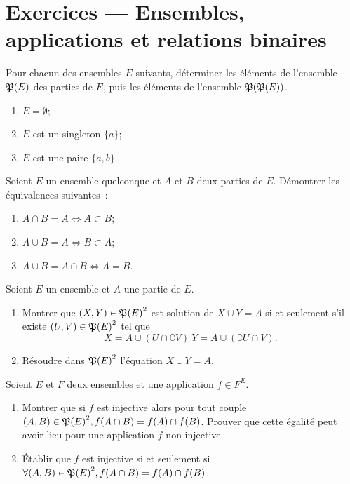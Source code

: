 \section{Exercices --- Ensembles, applications et relations binaires}

\begin{exercice}
  Pour chacun des ensembles \(E\) suivants, déterminer les éléments de
  l'ensemble \(\Part(E)\) des parties de \(E\), puis les éléments de
  l'ensemble \(\mathfrak{P}(\mathfrak{P}(E))\).
  \begin{enumerate}
    \item \(E = \emptyset\);
    \item \(E\) est un singleton \(\{a\}\);
    \item \(E\) est une paire \(\{a, b\}\).
  \end{enumerate}
\end{exercice}

\begin{exercice}
  Soient \(E\) un ensemble quelconque et \(A\) et \(B\) deux parties de \(E\).
  Démontrer les équivalences suivantes~:
  \begin{enumerate}
    \item \(A \cap B = A \iff{}A \subset{}B \);
    \item \(A \cup B = A \iff{}B \subset{}A \);
    \item \(A \cup B = A \cap B \iff{}A = B \).
  \end{enumerate}
\end{exercice}

\begin{exercice}[Résolution dans \(\Part(E)\) des équations \(X \cup Y = A\) et
  \(X \cap Y = A\)]
  Soient \(E\) un ensemble et \(A\) une partie de \(E\).
  \begin{enumerate}
    \item Montrer que \((X,Y)\in{\mathfrak{P}(E)}^2\) est solution de \(X \cup Y = A\)
      si et seulement s'il existe \((U, V) \in{}{\mathfrak{P}(E)}^2\) tel que
      \[X = A\cup(U\cap \complement V) \ Y = A\cup(\complement U \cap V).\]
    \item Résoudre dans \({\mathfrak{P}(E)}^2\) l'équation \(X \cup Y = A\).
  \end{enumerate}
\end{exercice}

\begin{exercice}
  Soient \(E\) et \(F\) deux ensembles et une application \(f \in{}F^E\).
  \begin{enumerate}
    \item Montrer que si \(f\) est injective alors pour tout couple \((A,B)
      \in{}{\mathfrak{P}(E)}^2, f(A\cap B) = f(A) \cap f(B)\). Prouver que cette
      égalité peut avoir lieu pour une application \(f\) non injective.
    \item Établir que \(f\) est injective si et seulement si \(\forall{}(A,B)
      \in{}{\mathfrak{P}(E)}^2, f(A\cap B) = f(A) \cap f(B)\).
  \end{enumerate}
\end{exercice}

